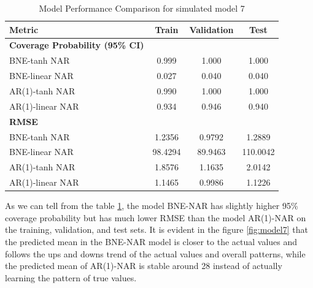 \documentclass{article}
\begin{document}
\begin{table}[htbp]
\centering
\caption{Model Performance Comparison for simulated model 7}
\label{tab:model7_comparison}
\begin{tabular}{lccc}
\toprule
\textbf{Metric} & \textbf{Train} & \textbf{Validation} & \textbf{Test} \\
\midrule
\textbf{Coverage Probability (95\% CI)} & & & \\
BNE-tanh NAR & 0.999 & 1.000 & 1.000 \\
BNE-linear NAR & 0.027 & 0.040 & 0.040 \\
AR(1)-tanh NAR & 0.990 & 1.000 & 1.000 \\
AR(1)-linear NAR & 0.934 & 0.946 & 0.940 \\
\midrule
\textbf{RMSE} & & & \\
BNE-tanh NAR & 1.2356 & 0.9792 & 1.2889 \\
BNE-linear NAR & 98.4294 & 89.9463 & 110.0042 \\
AR(1)-tanh NAR & 1.8576 & 1.1635 & 2.0142 \\
AR(1)-linear NAR & 1.1465 & 0.9986 & 1.1226 \\
\bottomrule
\end{tabular}
\end{table}

As we can tell from the table \ref{tab:model7_comparison}, the model BNE-NAR has slightly higher 95\% coverage probability but has much lower RMSE than the model AR(1)-NAR on the training, validation, and test sets. It is evident in the figure \ref{fig:model7} that the predicted mean in the BNE-NAR model is closer to the actual values and follows the ups and downs trend of the actual values and overall patterns, while the predicted mean of AR(1)-NAR is stable around 28 instead of actually learning the pattern of true values. 

\newpage
\end{document}
